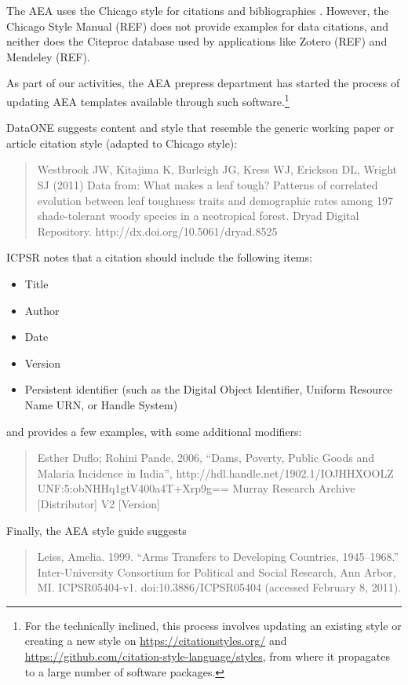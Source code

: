 \documentclass[AEJ]{AEA}
\begin{document}
The AEA uses the Chicago style for citations and bibliographies \citep{aeadatarefs}. However, the Chicago Style Manual (REF) does not provide examples for data citations, and neither does the Citeproc database used by applications like Zotero (REF) and Mendeley (REF).

As part of our activities, the AEA prepress department has started the process of updating AEA templates available through such software.\footnote{For the technically inclined, this process involves updating an existing style or creating a new style on \url{https://citationstyles.org/} and \url{https://github.com/citation-style-language/styles}, from where it propagates to a large number of software packages.}  

DataONE \citep{dataone-cite} suggests content and style that resemble the generic working paper or article citation style (adapted to Chicago style):
\begin{quote}
    Westbrook JW, Kitajima K, Burleigh JG, Kress WJ, Erickson DL, Wright SJ (2011) Data from: What makes a leaf tough? Patterns of correlated evolution between leaf toughness traits and demographic rates among 197 shade-tolerant woody species in a neotropical forest. Dryad Digital Repository. http://dx.doi.org/10.5061/dryad.8525
\end{quote}
ICPSR \citep{icpsr-data-cite} notes  that a citation should include the following items:
\begin{itemize}
    \item   Title
    \item   Author
    \item   Date
    \item   Version
    \item   Persistent identifier (such as the Digital Object Identifier, Uniform Resource Name URN, or Handle System)
\end{itemize}
and provides a few examples, with some additional modifiers:
\begin{quote}
    Esther Duflo; Rohini Pande, 2006, ``Dams, Poverty, Public Goods and Malaria Incidence in India'', http://hdl.handle.net/1902.1/IOJHHXOOLZ UNF:5:obNHHq1gtV400a4T+Xrp9g== Murray Research Archive [Distributor] V2 [Version]
\end{quote}
Finally, the AEA style guide \citep{aeadatarefs} suggests
\begin{quote}
    Leiss, Amelia. 1999. ``Arms Transfers to Developing Countries, 1945–1968.'' 
    Inter-University Consortium for Political and Social Research, Ann Arbor, MI. 
    ICPSR05404-v1. doi:10.3886/ICPSR05404 (accessed February 8, 2011).
\end{quote}
\end{document}
